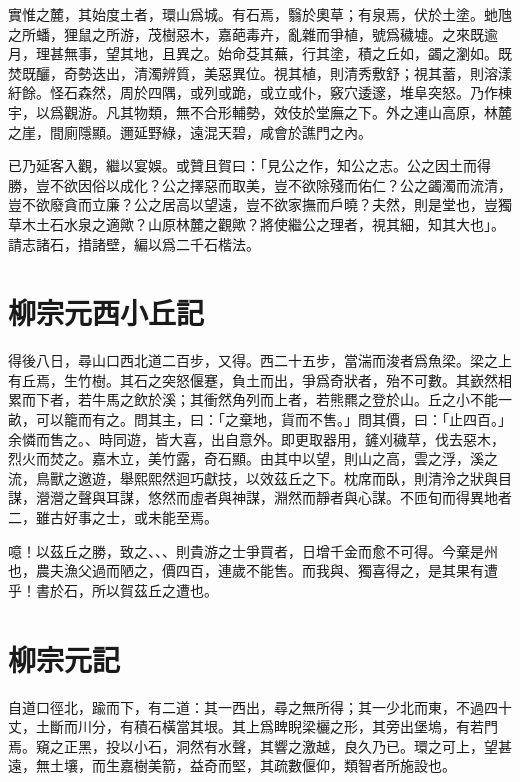 實惟之麓，其始度土者，環山爲城。有石焉，翳於奧草；有泉焉，伏於土塗。{虵}虺之所蟠，{狸}鼠之所游，茂樹惡木，嘉葩毒卉，亂雜而爭植，號爲穢墟。之來既逾月，理甚無事，望其地，且異之。始命芟其蕪，行其塗，積之丘如，蠲之瀏如。既焚既釃，奇勢迭出，清濁辨質，美惡異位。視其植，則清秀敷舒；視其蓄，則溶漾紆餘。怪石森然，周於四隅，或列或跪，或立或仆，竅穴逶邃，堆阜突怒。乃作棟宇，以爲觀游。凡其物類，無不合形輔勢，效伎於堂廡之下。外之連山高原，林麓之崖，間廁隱顯。邇延野綠，遠混天碧，咸會於譙門之內。

已乃延客入觀，繼以宴娛。或贊且賀曰：「見公之作，知公之志。公之因土而得勝，豈不欲因俗以成化？公之擇惡而取美，豈不欲除殘而佑仁？公之蠲濁而流清，豈不欲廢貪而立廉？公之居高以望遠，豈不欲家撫而戶曉？夫然，則是堂也，豈獨草木土石水泉之適歟？山原林麓之觀歟？將使繼公之理者，視其細，知其大也」。請志諸石，措諸壁，編以爲二千石楷法。
\nopagebreak
\theendnotes

\section[鈷鉧潭西小丘記\quad{\small 柳宗元}]{{\normalsize 柳宗元}\quad {}西小丘記}
得後八日，尋山口西北道二百步，又得。西二十五步，當湍而浚者爲魚梁。梁之上有丘焉，生竹樹。其石之突怒偃蹇，負土而出，爭爲奇狀者，殆不可數。其嶔然相累而下者，若牛馬之飲於溪；其衝然角列而上者，若熊羆之登於山。丘之小不能一畝，可以籠而有之。問其主，曰：「之棄地，貨而不售。」問其價，曰：「止四百。」余憐而售之。、時同遊，皆大喜，出自意外。即更取器用，鏟刈穢草，伐去惡木，烈火而焚之。嘉木立，美竹露，奇石顯。由其中以望，則山之高，雲之浮，溪之流，鳥獸之邀遊，舉熙熙然迴巧獻技，以效茲丘之下。枕席而臥，則清泠之狀與目謀，瀯瀯之聲與耳謀，悠然而虛者與神謀，淵然而靜者與心謀。不匝旬而得異地者二，雖古好事之士，或未能至焉。

噫！以茲丘之勝，致之、、、則貴游之士爭買者，日增千金而愈不可得。今棄是州也，農夫漁父過而陋之，價四百，連歲不能售。而我與、獨喜得之，是其果有遭乎！書於石，所以賀茲丘之遭也。

\section[小石城山記\quad{\small 柳宗元}]{{\normalsize 柳宗元}\quad {}記}
自道口徑北，踰而下，有二道：其一西出，尋之無所得；其一少北而東，不過四十丈，土斷而川分，有積石橫當其垠。其上爲睥睨梁欐之形，其旁出堡塢，有若門焉。窺之正黑，投以小石，洞然有水聲，其響之激越，良久乃已。環之可上，望甚遠，無土壤，而生嘉樹美箭，益奇而堅，其疏數偃仰，類智者所施設也。

